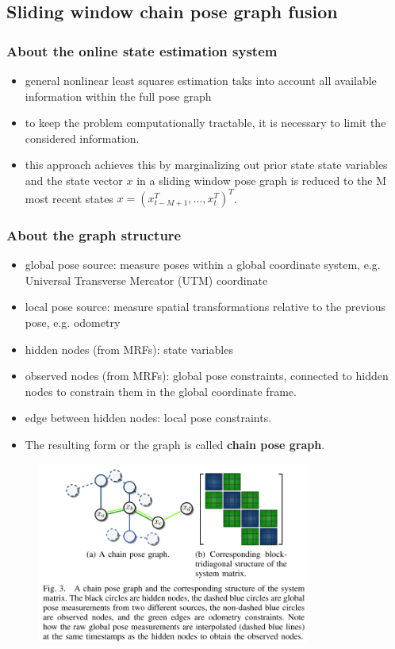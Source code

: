 \documentclass[letterpaper,11pt]{article}
\begin{document}
\subsection{Sliding window chain pose graph fusion}

\subsubsection{About the online state estimation system}

\begin{itemize}
	\item general nonlinear least squares estimation taks into account all available information within the full pose graph
	\item to keep the problem computationally tractable, it is necessary to limit the considered information.
	\item this approach achieves this by marginalizing out prior state state variables and the state vector \(x\) in a sliding window pose graph is reduced to the M most recent states \(x=(x_{t-M+1}^T,...,x_t^T)^T\).
\end{itemize}

\subsubsection{About the graph structure}

\begin{itemize}
	\item global pose source: measure poses within a global coordinate system, e.g. Universal Transverse Mercator (UTM) coordinate
	\item local pose source:  measure spatial transformations relative to the previous pose, e.g. odometry
	\item hidden nodes (from MRFs): state variables
	\item observed nodes (from MRFs): global pose constraints, connected to hidden nodes to constrain them in the global coordinate frame.
	\item edge between hidden nodes: local pose constraints.
	\item The resulting form or the graph is called \textbf{chain pose graph}.
\end{itemize}

\begin{figure}[!ht]
	\centering
	\includegraphics[width=0.8\textwidth]{./img/posegraph.png}
\end{figure}
\end{document}
